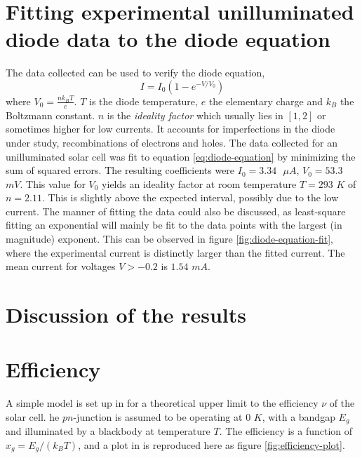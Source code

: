 \documentclass[a4paper,twoside=false,abstract=false,numbers=noenddot,
titlepage=false,headings=small,parskip=half,version=last]{scrartcl}
\begin{document}
\section{Fitting experimental unilluminated diode data to the diode equation}
The data collected can be used to verify the diode equation,
\begin{equation}
I = I_0 \left( 1 - e^{-V/V_0}\right)\label{eq:diode-equation}
\end{equation}
where $V_0 = \frac{nk_BT}{e}$.
$T$ is the diode temperature, $e$ the elementary charge and $k_B$ the Boltzmann constant.
$n$ is the \emph{ideality factor} which usually lies in $[1,2]$ or sometimes higher for low currents.
It accounts for imperfections in the diode under study, recombinations of electrons and holes.
The data collected for an unilluminated solar cell was fit to equation \eqref{eq:diode-equation} by minimizing the sum of squared errors.
The resulting coefficients were $I_0=3.34\text{ }\mu A$, $V_0=53.3$ $mV$.
This value for $V_0$ yields an ideality factor at room temperature $T=293$ $K$ of $n = 2.11$.
This is slightly above the expected interval, possibly due to the low current.
The manner of fitting the data could also be discussed, as least-square fitting an exponential will mainly be fit to the data points with the largest (in magnitude) exponent.
This can be observed in figure \ref{fig:diode-equation-fit}, where the experimental current is distinctly larger than the fitted current.
The mean current for voltages $V>-0.2$ is $1.54$ $mA$.
\section{Discussion of the results}


\section{Efficiency}
A simple model is set up in \cite{lab-instruction} for a theoretical upper limit to the efficiency $\nu$ of the solar cell. 
he $pn$-junction is assumed to be operating at $0$ $K$, with a bandgap $E_g$ and illuminated by a blackbody at temperature $T$.
The efficiency is a function of $x_g=E_g/(k_BT)$, and a plot in \cite{lab-instruction} is reproduced here as figure \ref{fig:efficiency-plot}.
\end{document}
